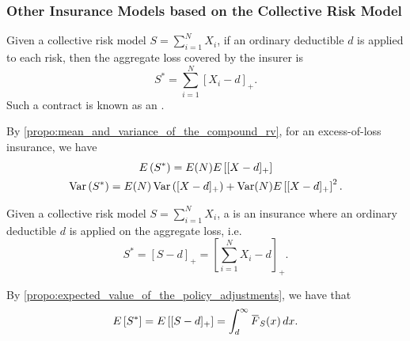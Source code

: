 \documentclass[notoc,notitlepage]{tufte-book}
\begin{document}
\subsubsection{Other Insurance Models based on the Collective Risk Model}%
\label{ssub:other_insurance_models_based_on_the_collective_risk_model}

\begin{defn}\label{defn:excess_of_loss_insurance}
  Given a collective risk model $S = \sum_{i=1}^{N} X_i$, if an ordinary deductible $d$ is applied to each risk, then the aggregate loss covered by the insurer is
  \begin{equation*}
    S^* = \sum_{i=1}^{N} [ X_i - d ]_+.
  \end{equation*}
  Such a contract is known as an .
\end{defn}

\begin{note}
  By \cref{propo:mean_and_variance_of_the_compound_rv}, for an excess-of-loss insurance, we have
  \begin{gather*}
    E \left( S^* \right) = E (N) E \left[ [ X - d ]_+ \right] \\
    \operatorname{Var} \left( S^* \right)= E(N) \operatorname{Var}\left( [ X - d ]_+ \right) + \operatorname{Var}(N) E \left[ [ X - d ]_+ \right]^2.
  \end{gather*}
\end{note}

\begin{defn}\label{defn:stop_loss_insurance}
  Given a collective risk model $S = \sum_{i=1}^{N} X_i$, a  is an insurance where an ordinary deductible $d$ is applied on the aggregate loss, i.e.
  \begin{equation*}
    S^* = [ S - d ]_+ = \left[ \sum_{i=1}^{N} X_i - d \right]_+.
  \end{equation*}
\end{defn}

\begin{note}
  By \cref{propo:expected_value_of_the_policy_adjustments}, we have that
  \begin{equation*}
    E \left[ S^* \right] = E \left[ [ S - d ]_+ \right] = \int_{d}^{\infty} \bar{F}_S(x) \dif{x}.
  \end{equation*}
\end{note}
\end{document}
